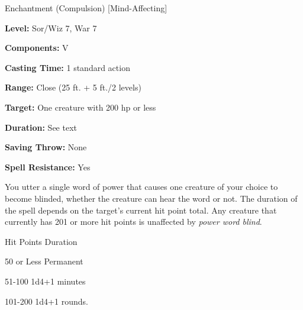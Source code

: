 
Enchantment (Compulsion) [Mind-Affecting]

\textbf{Level:} Sor/Wiz 7, War 7

\textbf{Components:} V

\textbf{Casting Time:} 1 standard action

\textbf{Range:} Close (25 ft. + 5 ft./2 levels)

\textbf{Target:} One creature with 200 hp or less

\textbf{Duration:} See text

\textbf{Saving Throw:} None

\textbf{Spell Resistance:} Yes

You utter a single word of power that causes one creature of your choice to become 
blinded, whether the creature can hear the word or not. The duration of the spell 
depends on the target's current hit point total. Any creature that currently has 
201 or more hit points is unaffected by \textit{power word blind}.

\begin{description*}
\item[Hit Points] Duration
\item[50 or Less] Permanent
\item[51-100] 1d4+1 minutes
\item[101-200] 1d4+1 rounds.
\end{description*}
